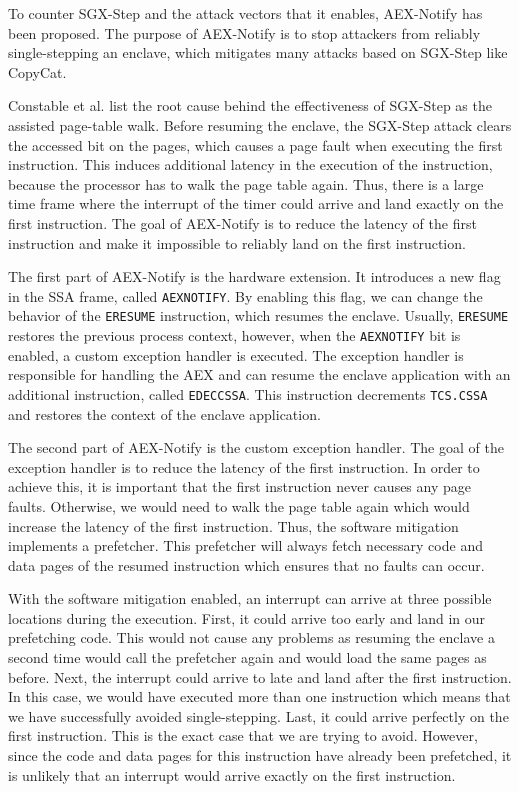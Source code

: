 \documentclass{llncs}
\begin{document}
To counter SGX-Step and the attack vectors that it enables, AEX-Notify has been proposed.
The purpose of AEX-Notify is to stop attackers from reliably single-stepping an enclave,
which mitigates many attacks based on SGX-Step like CopyCat.

Constable et al. \cite{ConstableBCXXAK23} list the root cause behind the effectiveness of SGX-Step as the assisted page-table walk.
Before resuming the enclave, the SGX-Step attack clears the accessed bit on the pages,
which causes a page fault when executing the first instruction.
This induces additional latency in the execution of the instruction, because
the processor has to walk the page table again.
Thus, there is a large time frame where the interrupt of the timer could
arrive and land exactly on the first instruction.
The goal of AEX-Notify is to reduce the latency of the first instruction
and make it impossible to reliably land on the first instruction.

The first part of AEX-Notify is the hardware extension.
It introduces a new flag in the SSA frame, called \texttt{AEXNOTIFY}.
By enabling this flag, we can change the behavior of the \texttt{ERESUME} instruction,
which resumes the enclave.
Usually, \texttt{ERESUME} restores the previous process context,
however, when the \texttt{AEXNOTIFY} bit is enabled,
a custom exception handler is executed.
The exception handler is responsible for handling the AEX and
can resume the enclave application with an additional instruction, called \texttt{EDECCSSA}.
This instruction decrements \texttt{TCS.CSSA} and restores the context of the enclave application.

The second part of AEX-Notify is the custom exception handler.
The goal of the exception handler is to reduce the latency of the first instruction.
In order to achieve this, it is important that the first instruction never causes any page faults.
Otherwise, we would need to walk the page table again which would increase the latency of the first instruction.
Thus, the software mitigation implements a prefetcher.
This prefetcher will always fetch necessary code and data pages of the resumed
instruction which ensures that no faults can occur.

With the software mitigation enabled, an interrupt can arrive at three possible
locations during the execution.
First, it could arrive too early and land in our prefetching code.
This would not cause any problems as resuming the enclave a second time would
call the prefetcher again and would load the same pages as before.
Next, the interrupt could arrive to late and land after the first instruction.
In this case, we would have executed more than one instruction which means
that we have successfully avoided single-stepping.
Last, it could arrive perfectly on the first instruction.
This is the exact case that we are trying to avoid.
However, since the code and data pages for this instruction have already been prefetched,
it is unlikely that an interrupt would arrive exactly on the first instruction.
\end{document}
